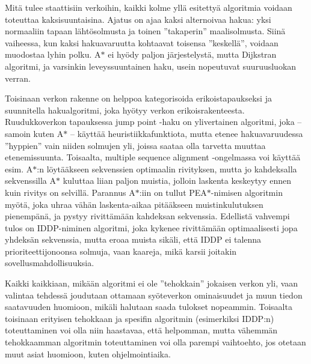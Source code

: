 \documentclass[12pt]{article}
\begin{document}
Mitä tulee staattisiin verkoihin, kaikki kolme yllä esitettyä algoritmia voidaan toteuttaa kaksisuuntaisina. Ajatus on ajaa kaksi alternoivaa hakua: yksi normaaliin tapaan lähtösolmusta ja toinen ''takaperin'' maalisolmusta. Siinä vaiheessa, kun kaksi hakuavaruutta kohtaavat toisensa ''keskellä'', voidaan muodostaa lyhin polku. A$\ast$ ei hyödy paljon järjestelystä, mutta Dijkstran algoritmi, ja varsinkin leveyssuuntainen haku, usein nopeutuvat suuruusluokan verran.

Toisinaan verkon rakenne on helppoa kategorisoida erikoistapaukseksi ja suunnitella hakualgoritmi, joka hyötyy verkon erikoisrakenteesta. Ruudukkoverkon tapauksessa jump point -haku on ylivertainen algoritmi, joka -- samoin kuten A$\ast$ -- käyttää heuristiikkafunktiota, mutta etenee hakuavaruudessa ''hyppien'' vain niiden solmujen yli, joissa saataa olla tarvetta muuttaa etenemissuunta. Toisaalta, multiple sequence alignment -ongelmassa voi käyttää esim. A$\ast$:n löytääkseen sekvenssien optimaalin rivityksen, mutta jo kahdeksalla sekvenssilla A$\ast$ kuluttaa liian paljon muistia, jolloin laskenta keskeytyy ennen kuin rivitys on selvillä. Parannus A$\ast$:iin on tullut PEA$\ast$-nimisen algoritmin myötä, joka uhraa vähän laskenta-aikaa pitääkseen muistinkulutuksen pienempänä, ja pystyy rivittämään kahdeksan sekvenssia. Edellistä vahvempi tulos on IDDP-niminen algoritmi, joka kykenee rivittämään optimaalisesti jopa yhdeksän sekvenssia, mutta eroaa muista sikäli, että IDDP ei talenna prioriteettijonoonsa solmuja, vaan kaareja, mikä karsii joitakin sovellusmahdollisuuksia.

Kaikki kaikkiaan, mikään algoritmi ei ole ''tehokkain'' jokaisen verkon yli, vaan valintaa tehdessä joudutaan ottamaan syöteverkon ominaisuudet ja muun tiedon saatavuuden huomioon, mikäli halutaan saada tulokset nopeammin. Toisaalta toisinaan erityisen tehokkaan ja spesifin algoritmin (esimerkiksi IDDP:n) toteuttaminen voi olla niin haastavaa, että helpomman, mutta vähemmän tehokkaamman algoritmin toteuttaminen voi olla parempi vaihtoehto, jos otetaan muut asiat huomioon, kuten ohjelmointiaika.
\end{document}
